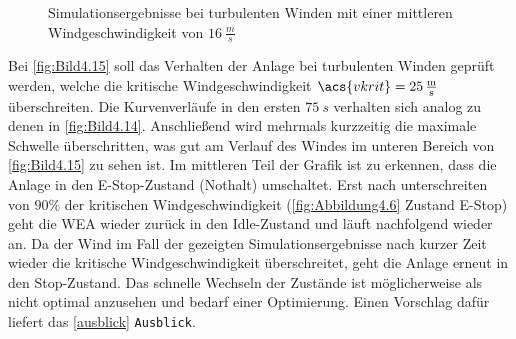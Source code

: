 \begin{figure}[H]
   \centering
   \caption[Simulationsergebnisse bei moderaten turbulenten Winden]{Simulationsergebnisse bei turbulenten Winden mit einer mittleren Windgeschwindigkeit von $\SI{16}{\frac{m}{s}}$}
   \label{fig:Bild4.14}
\end{figure}

Bei \autoref{fig:Bild4.15} soll das Verhalten der Anlage bei turbulenten Winden geprüft werden, welche die kritische Windgeschwindigkeit $\acs{vkrit} = \SI{25}{\frac{m}{s}}$ überschreiten. Die Kurvenverläufe in den ersten $\SI{75}{s}$ verhalten sich analog zu denen in \autoref{fig:Bild4.14}. Anschließend wird mehrmals kurzzeitig die maximale Schwelle überschritten, was gut am Verlauf des Windes im unteren Bereich von \autoref{fig:Bild4.15} zu sehen ist. Im mittleren Teil der Grafik ist zu erkennen, dass die Anlage in den E-Stop-Zustand (Nothalt) umschaltet. Erst nach unterschreiten von $90\%$ der kritischen Windgeschwindigkeit (\vgl \autoref{fig:Abbildung4.6} Zustand E-Stop) geht die WEA wieder zurück in den Idle-Zustand und läuft nachfolgend wieder an. Da der Wind im Fall der gezeigten Simulationsergebnisse nach kurzer Zeit wieder die kritische Windgeschwindigkeit überschreitet, geht die Anlage erneut in den Stop-Zustand. Das schnelle Wechseln der Zustände ist möglicherweise als nicht optimal anzusehen und bedarf einer Optimierung. Einen Vorschlag dafür liefert das \autoref{ausblick} \texttt{Ausblick}.  

